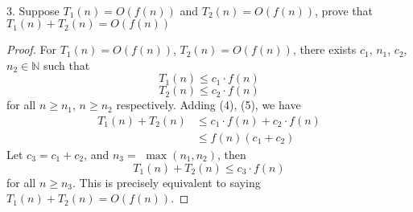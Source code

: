 \documentclass{article}
\begin{document}
\begin{align*}
\end{align*}
3. Suppose $T_{1}(n) = O(f(n))$ and $T_{2}(n) = O(f(n))$, prove that $T_{1}(n) + T_{2}(n) = O(f(n))$

\vspace{5mm}

\begin{proof}
For $T_1(n) = O(f(n))$, $T_2(n) = O(f(n))$, there exists $c_1$, $n_1$, $c_2$, $n_2 \in \mathbb{N}$ such that
\begin{equation}
T_1(n) \leq c_1 \cdot f(n)
\end{equation}
\begin{equation}
T_2(n) \leq c_2 \cdot f(n)
\end{equation}
for all $n \geq n_1$, $n \geq n_2$ respectively. Adding (4), (5), we have
\begin{align*}
T_1(n) + T_2(n) &\leq c_1 \cdot f(n) + c_2 \cdot f(n) \\
&\leq f(n)( c_1 + c_2 )
\end{align*}
Let $c_3 = c_1 + c_2$, and $n_3 =$ $\max(n_1, n_2)$, then
\begin{equation}
T_1(n)+T_2(n) \leq c_3 \cdot f(n)
\end{equation}
for all $n \geq n_3$. This is precisely equivalent to saying $T_1(n) + T_2(n) = O(f(n)).$

\end{proof}
\end{document}
